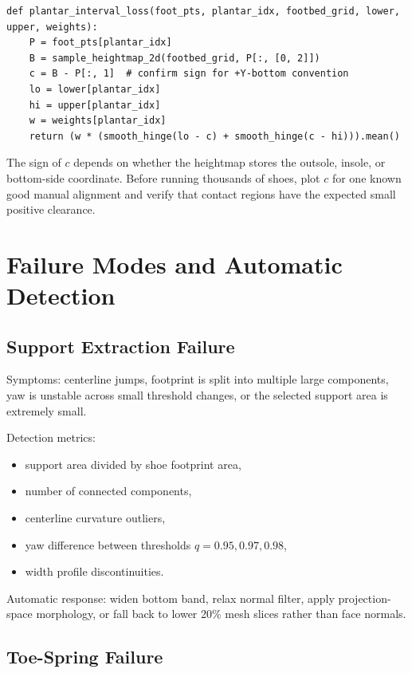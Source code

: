 \documentclass[11pt]{article}
\begin{document}
\begin{lstlisting}[style=pythonstyle]
def plantar_interval_loss(foot_pts, plantar_idx, footbed_grid, lower, upper, weights):
    P = foot_pts[plantar_idx]
    B = sample_heightmap_2d(footbed_grid, P[:, [0, 2]])
    c = B - P[:, 1]  # confirm sign for +Y-bottom convention
    lo = lower[plantar_idx]
    hi = upper[plantar_idx]
    w = weights[plantar_idx]
    return (w * (smooth_hinge(lo - c) + smooth_hinge(c - hi))).mean()
\end{lstlisting}

The sign of $c$ depends on whether the heightmap stores the outsole, insole, or bottom-side coordinate. Before running thousands of shoes, plot $c$ for one known good manual alignment and verify that contact regions have the expected small positive clearance.

\section{Failure Modes and Automatic Detection}

\subsection{Support Extraction Failure}

Symptoms: centerline jumps, footprint is split into multiple large components, yaw is unstable across small threshold changes, or the selected support area is extremely small.

Detection metrics:

\begin{itemize}
  \item support area divided by shoe footprint area,
  \item number of connected components,
  \item centerline curvature outliers,
  \item yaw difference between thresholds $q=0.95,0.97,0.98$,
  \item width profile discontinuities.
\end{itemize}

Automatic response: widen bottom band, relax normal filter, apply projection-space morphology, or fall back to lower 20\% mesh slices rather than face normals.

\subsection{Toe-Spring Failure}
\end{document}
